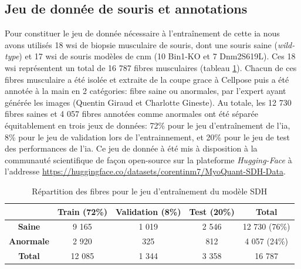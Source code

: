 \subsection{Jeu de donnée de souris et annotations}
Pour constituer le jeu de donnée nécessaire à l'entraînement de cette \gls{ia} nous avons utilisés 18 \gls{wsi} de biopsie musculaire de souris, dont une souris saine (\textit{wild-type}) et 17 \gls{wsi} de souris modèles de \gls{cnm} (10 Bin1-KO et 7 Dnm2S619L). Ces 18 \gls{wsi} représentent un total de 16 787 fibres musculaires (tableau \ref{tab:sdh_fiber_count}). Chacun de ces fibres musculaire a été isolée et extraite de la coupe grace à Cellpose puis a été annotée à la main en 2 catégories: fibre saine ou anormales, par l'expert ayant générée les images (Quentin Giraud et Charlotte Gineste). Au totale, les 12 730 fibres saines et 4 057 fibres annotées comme anormales ont été séparée équitablement en trois jeux de données: 72\% pour le jeu d'entraînement de l'\gls{ia}, 8\% pour le jeu de validation lors de l'entrainnement, et 20\% pour le jeu de test des performances de l'\gls{ia}. Ce jeu de donnée à été mis à disposition à la communauté scientifique de façon open-source sur la plateforme \textit{Hugging-Face} à l'addresse \href{https://huggingface.co/datasets/corentinm7/MyoQuant-SDH-Data}{https://huggingface.co/datasets/corentinm7/MyoQuant-SDH-Data}.

\begin{table}[htbp]
\centering
\caption{Répartition des fibres pour le jeu d'entraînement du modèle SDH}
\label{tab:sdh_fiber_count}
\begin{tabular}{|c|c|c|c|c|}
\hline
 & \textbf{Train} (72\%) & \textbf{Validation} (8\%) & \textbf{Test} (20\%) & \textbf{Total} \\
\hline
\textbf{Saine} & 9 165 & 1 019 & 2 546 & 12 730 (76\%) \\
\hline
\textbf{Anormale} & 2 920 & 325 & 812 & 4 057 (24\%) \\
\hline
\hline
\textbf{Total} & 12 085 & 1 344 & 3 358 & 16 787 \\
\hline
\end{tabular}
\end{table}


